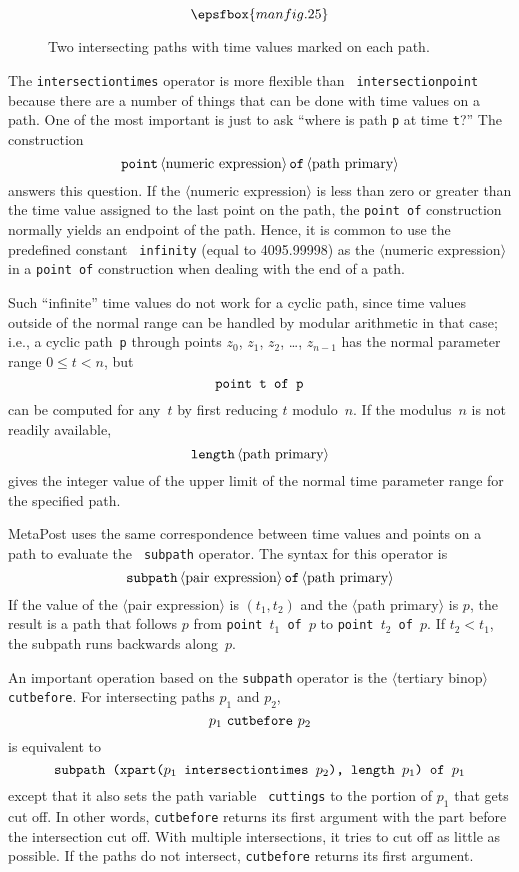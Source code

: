 \documentclass{article} %
\newcommand\descr[1]{{\langle\hbox{#1}\rangle}}
\newcommand\invisgap{\nobreak\hskip0pt\relax}
\newcommand\tdescr[1]{$\langle$\invisgap#1\invisgap$\rangle$}
\begin{document}
\begin{figure}[htp]
$$ \epsfbox{manfig.25} $$
\caption{Two intersecting paths with time values marked on each path.}
\label{fig24}
\end{figure}

The {\tt intersectiontimes} operator is more flexible than {\tt
intersectionpoint} because there are a number of things that can be done
with time values on a path.  One of the most important is just to ask
``where is path {\tt p} at time {\tt t}?''  The construction\label{Dpntof}
$$ {\tt point}\, \descr{numeric expression}\, {\tt of}\, \descr{path primary} $$
answers this question.  If the \tdescr{numeric expression} is less than
zero or greater than the time value assigned to the last point on the
path, the {\tt point of} construction normally yields an endpoint of the
path.  Hence, it is common to use the predefined constant {\tt
infinity}\label{Dinf} (equal to
4095.99998) as the \tdescr{numeric expression} in a {\tt point of}
construction when dealing with the end of a path.

Such ``infinite'' time values do not work for a cyclic path, since time
values outside of the normal range can be handled by modular arithmetic
in that case; i.e., a cyclic path~{\tt p} through points $z_0$, $z_1$,
$z_2$, \ldots, $z_{n-1}$ has the normal parameter range $0\le t<n$, but
$$ \hbox{\tt point t of p} $$
can be computed for any~$t$ by first reducing $t$ modulo~$n$.  If the
modulus~$n$ is not readily
available,\label{Dlength}
$$ {\tt length}\, \descr{path primary} $$
gives the integer value of the upper limit of the normal time parameter
range for the specified path.

MetaPost uses the same correspondence between time values and points on
a path to evaluate the {\tt
subpath}\label{Dsubpth} operator.  The
syntax for this operator is
$$ {\tt subpath}\, \descr{pair expression}\, {\tt of}\, \descr{path primary} $$
If the value of the \tdescr{pair expression} is $(t_1,t_2)$ and the
\tdescr{path primary} is $p$, the result is a path that follows $p$ from
{\tt point $t_1$ of $p$} to {\tt point $t_2$ of $p$}.  If $t_2<t_1$, the
subpath runs backwards along~$p$.

An important operation based on the {\tt subpath} operator is the
\tdescr{tertiary binop}\index{tertiary binop?\tdescr{tertiary binop}}
{\tt cutbefore}\label{Dcutb}.  For
intersecting paths $p_1$ and $p_2$,
$$ p_1\ {\tt cutbefore}\ p_2 $$
is equivalent to
$$ \hbox{\tt subpath (xpart($p_1$ intersectiontimes $p_2$), length $p_1$) of $p_1$}
$$
except that it also sets the path variable {\tt
cuttings}\label{Dcuttings} to the
portion of $p_1$ that gets cut off.  In other words, {\tt cutbefore}
returns its first argument with the part before the intersection cut
off.  With multiple intersections, it tries to cut off as little as
possible.  If the paths do not intersect, {\tt cutbefore} returns its
first argument.
\end{document}
